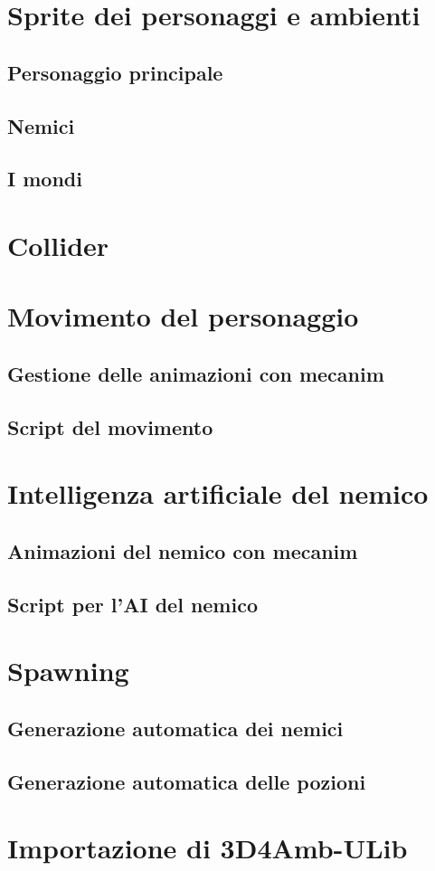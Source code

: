 \documentclass[12pt,a4paper,openright,twoside]{book}
\begin{document}
	\section[Sprite]{Sprite dei personaggi e ambienti}
	
	\subsection{Personaggio principale}
	\subsection{Nemici}
	\subsection{I mondi}
	\section{Collider}
	\section[Movimento]{Movimento del personaggio}
	\subsection{Gestione delle animazioni con mecanim}
	\subsection{Script del movimento}
	\section[AI del nemico]{Intelligenza artificiale del nemico}
	\subsection{Animazioni del nemico con mecanim}
	\subsection{Script per l'AI del nemico}
	\section{Spawning}
	\subsection{Generazione automatica dei nemici}
	\subsection{Generazione automatica delle pozioni}
	\section[3D4Amb-ULib]{Importazione di 3D4Amb-ULib}
    
    
\end{document}
